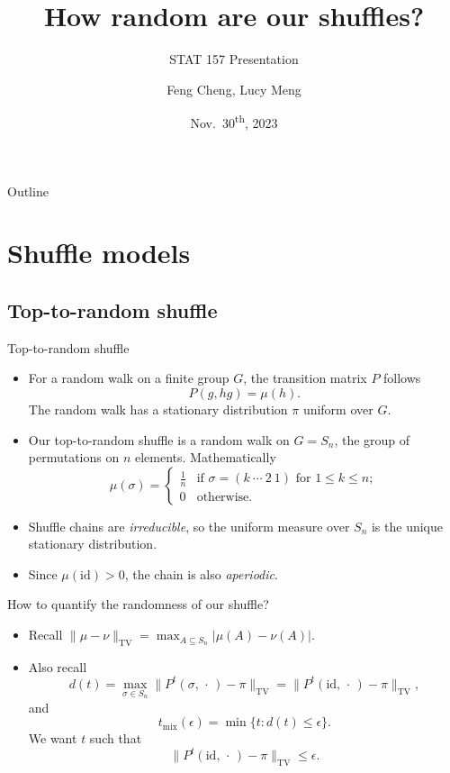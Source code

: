 \documentclass[10pt]{beamer}
\title{How random are our shuffles?}
\subtitle{STAT 157 Presentation}
\author{Feng Cheng, Lucy Meng}
\date{Nov.\ 30\textsuperscript{th}, 2023}
\newcommand{\blank}{\,\cdot\,}
\newcommand{\id}{\mathrm{id}}
\newcommand{\nm}[1]{\lVert #1 \rVert_\mathrm{TV}}
\newcommand{\tmix}{t_\mathrm{mix}}
\newcommand{\abs}[1]{\lvert #1 \rvert}
\begin{document}
\begin{frame}
    \titlepage
\end{frame}

\begin{frame}{Outline}
    \tableofcontents
\end{frame}

\section{Shuffle models}
\subsection{Top-to-random shuffle}
\begin{frame}[allowframebreaks]{Top-to-random shuffle}
    \begin{itemize}
        \item For a random walk on a finite group $G$, the transition matrix $P$ follows
        \[P(g,hg) = \mu(h).\]
        The random walk has a stationary distribution $\pi$ uniform over $G$.
        \item Our top-to-random shuffle is a random walk on $G = S_n$, the group of permutations on $n$ elements. Mathematically \[
        \mu(\sigma) = \begin{cases}
            \frac{1}{n} & \text{if }\sigma = (k\ \cdots\ 2\ 1) \text{ for }1 \leq k\leq n; \\
            0 & \text{otherwise}.
        \end{cases}
        \]
        \item Shuffle chains
        are \emph{irreducible}, so the uniform measure over $S_n$ is the unique stationary distribution.
        \item Since $\mu(\id) > 0$, the chain is also \emph{aperiodic}.
    \end{itemize}    
    \framebreak
        How to quantify the randomness of our shuffle?
    \begin{itemize}
        \item Recall $\nm{\mu - \nu} = \max_{A \subseteq S_n}\abs{\mu(A) - \nu(A)}$.
        \item Also recall \[
            d(t) = \max_{\sigma \in S_n} \nm{P^t(\sigma,\blank) - \pi} = \nm{P^t(\id,\blank) - \pi},
        \] and \[\tmix(\epsilon) = \min\{t:d(t) \leq \epsilon\}.\]
        We want $t$ such that \[\nm{P^t(\id,\blank) - \pi} \leq \epsilon.\]
    \end{itemize}
\end{frame}
\end{document}
